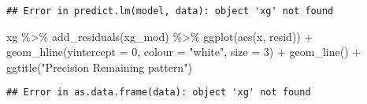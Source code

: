 \documentclass[
]{article}
\newenvironment{Shaded}{\begin{snugshade}}{\end{snugshade}}
\newcommand{\AttributeTok}[1]{\textcolor[rgb]{0.77,0.63,0.00}{#1}}
\newcommand{\DecValTok}[1]{\textcolor[rgb]{0.00,0.00,0.81}{#1}}
\newcommand{\FunctionTok}[1]{\textcolor[rgb]{0.00,0.00,0.00}{#1}}
\newcommand{\NormalTok}[1]{#1}
\newcommand{\SpecialCharTok}[1]{\textcolor[rgb]{0.00,0.00,0.00}{#1}}
\newcommand{\StringTok}[1]{\textcolor[rgb]{0.31,0.60,0.02}{#1}}
\begin{document}
\begin{verbatim}
## Error in predict.lm(model, data): object 'xg' not found
\end{verbatim}

\begin{Shaded}
\begin{Highlighting}[]
\NormalTok{xg }\SpecialCharTok{\%\textgreater{}\%} 
  \FunctionTok{add\_residuals}\NormalTok{(xg\_mod) }\SpecialCharTok{\%\textgreater{}\%} 
  \FunctionTok{ggplot}\NormalTok{(}\FunctionTok{aes}\NormalTok{(x, resid)) }\SpecialCharTok{+} 
  \FunctionTok{geom\_hline}\NormalTok{(}\AttributeTok{yintercept =} \DecValTok{0}\NormalTok{, }\AttributeTok{colour =} \StringTok{"white"}\NormalTok{, }\AttributeTok{size =} \DecValTok{3}\NormalTok{) }\SpecialCharTok{+} 
  \FunctionTok{geom\_line}\NormalTok{() }\SpecialCharTok{+} 
  \FunctionTok{ggtitle}\NormalTok{(}\StringTok{"Precision Remaining pattern"}\NormalTok{)}
\end{Highlighting}
\end{Shaded}

\begin{verbatim}
## Error in as.data.frame(data): object 'xg' not found
\end{verbatim}
\end{document}
